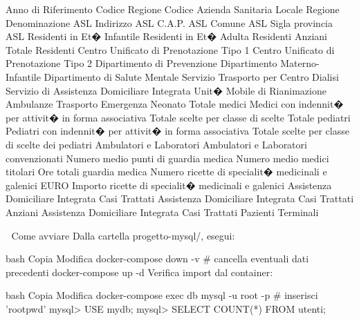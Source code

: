 Anno di Riferimento
Codice Regione
Codice Azienda Sanitaria Locale
Regione 
Denominazione ASL
Indirizzo ASL
C.A.P. ASL
Comune ASL
Sigla provincia ASL
Residenti in Et� Infantile
Residenti in Et� Adulta
Residenti Anziani
Totale Residenti
Centro Unificato di Prenotazione Tipo 1
Centro Unificato di Prenotazione Tipo 2
Dipartimento di Prevenzione
Dipartimento Materno-Infantile
Dipartimento di Salute Mentale
Servizio Trasporto per Centro Dialisi
Servizio di Assistenza Domiciliare Integrata
Unit� Mobile di Rianimazione
Ambulanze Trasporto Emergenza Neonato
Totale medici
Medici con indennit� per attivit� in forma associativa
Totale scelte per classe di scelte
Totale pediatri
Pediatri con indennit� per attivit� in forma associativa
Totale scelte per classe di scelte dei pediatri
Ambulatori e Laboratori
Ambulatori e Laboratori convenzionati
Numero medio punti di guardia medica
Numero medio medici titolari
Ore totali guardia medica
Numero ricette di specialit� medicinali e galenici
EURO Importo ricette di specialit� medicinali e galenici
Assistenza Domiciliare Integrata Casi Trattati
Assistenza Domiciliare Integrata Casi Trattati Anziani
Assistenza Domiciliare Integrata Casi Trattati Pazienti Terminali


🚀 Come avviare
Dalla cartella progetto-mysql/, esegui:

bash
Copia
Modifica
docker-compose down -v   # cancella eventuali dati precedenti
docker-compose up -d
Verifica import dal container:

bash
Copia
Modifica
docker-compose exec db mysql -u root -p
# inserisci 'rootpwd'
mysql> USE mydb;
mysql> SELECT COUNT(*) FROM utenti;

